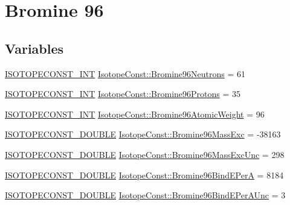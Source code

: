 \hypertarget{group___isotope_const-_bromine-_br96}{}\section{Bromine 96}
\label{group___isotope_const-_bromine-_br96}
\subsection*{Variables}
\begin{DoxyCompactItemize}
\item 
\mbox{\hyperlink{group___isotope_const-_macros_ga5f18360b3e99483a35c32d789e62621c}{I\+S\+O\+T\+O\+P\+E\+C\+O\+N\+S\+T\+\_\+\+I\+NT}} \mbox{\hyperlink{group___isotope_const-_bromine-_br96_ga8d802724f240ce89396ad4779f7becb1}{Isotope\+Const\+::\+Bromine96\+Neutrons}} = 61
\item 
\mbox{\hyperlink{group___isotope_const-_macros_ga5f18360b3e99483a35c32d789e62621c}{I\+S\+O\+T\+O\+P\+E\+C\+O\+N\+S\+T\+\_\+\+I\+NT}} \mbox{\hyperlink{group___isotope_const-_bromine-_br96_gaf2a6deb1b5eb0870a2d96b88a62b2e6d}{Isotope\+Const\+::\+Bromine96\+Protons}} = 35
\item 
\mbox{\hyperlink{group___isotope_const-_macros_ga5f18360b3e99483a35c32d789e62621c}{I\+S\+O\+T\+O\+P\+E\+C\+O\+N\+S\+T\+\_\+\+I\+NT}} \mbox{\hyperlink{group___isotope_const-_bromine-_br96_gaff04186f7e8b1f7a84ec34f177ef5556}{Isotope\+Const\+::\+Bromine96\+Atomic\+Weight}} = 96
\item 
\mbox{\hyperlink{group___isotope_const-_macros_ga8f45a7272ce02c0b4c65c44636ed719a}{I\+S\+O\+T\+O\+P\+E\+C\+O\+N\+S\+T\+\_\+\+D\+O\+U\+B\+LE}} \mbox{\hyperlink{group___isotope_const-_bromine-_br96_ga9a298850a1a4fa0c7c4a124612836357}{Isotope\+Const\+::\+Bromine96\+Mass\+Exc}} = -\/38163
\item 
\mbox{\hyperlink{group___isotope_const-_macros_ga8f45a7272ce02c0b4c65c44636ed719a}{I\+S\+O\+T\+O\+P\+E\+C\+O\+N\+S\+T\+\_\+\+D\+O\+U\+B\+LE}} \mbox{\hyperlink{group___isotope_const-_bromine-_br96_ga4efc60815e6e1ec70e67a837455255a6}{Isotope\+Const\+::\+Bromine96\+Mass\+Exc\+Unc}} = 298
\item 
\mbox{\hyperlink{group___isotope_const-_macros_ga8f45a7272ce02c0b4c65c44636ed719a}{I\+S\+O\+T\+O\+P\+E\+C\+O\+N\+S\+T\+\_\+\+D\+O\+U\+B\+LE}} \mbox{\hyperlink{group___isotope_const-_bromine-_br96_ga2465619a0b613ace22c3c87ad7eaa61e}{Isotope\+Const\+::\+Bromine96\+Bind\+E\+PerA}} = 8184
\item 
\mbox{\hyperlink{group___isotope_const-_macros_ga8f45a7272ce02c0b4c65c44636ed719a}{I\+S\+O\+T\+O\+P\+E\+C\+O\+N\+S\+T\+\_\+\+D\+O\+U\+B\+LE}} \mbox{\hyperlink{group___isotope_const-_bromine-_br96_ga88c527d00bba58785e15fb563eb107a2}{Isotope\+Const\+::\+Bromine96\+Bind\+E\+Per\+A\+Unc}} = 3

\end{DoxyCompactItemize}
